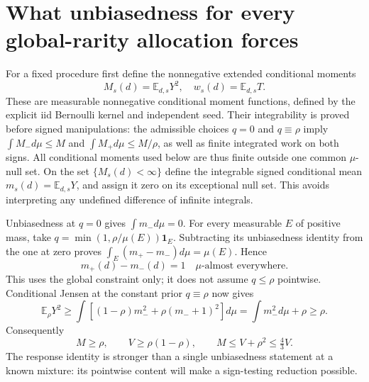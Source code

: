 \documentclass[11pt]{article}
\newcommand{\E}{\mathbb E}
\newcommand{\ind}{\mathbf1}
\begin{document}
\section{What unbiasedness for every global-rarity allocation forces}
For a fixed procedure first define the nonnegative extended conditional moments
\[
 M_s(d)=\E_{d,s}Y^2,
 \quad w_s(d)=\E_{d,s}T.
\]
These are measurable nonnegative conditional moment functions, defined by the
explicit iid Bernoulli kernel and independent seed. Their integrability is
proved before signed manipulations: the admissible choices $q=0$ and
$q\equiv\rho$ imply $\int M_-d\mu\le M$ and
$\int M_+d\mu\le M/\rho$, as well as finite integrated work on both signs.
All conditional moments used below are thus finite outside one common
$\mu$-null set. On the set $\{M_s(d)<\infty\}$ define the integrable signed
conditional mean $m_s(d)=\E_{d,s}Y$, and assign it zero on its exceptional null
set. This avoids interpreting any undefined difference of infinite integrals.

Unbiasedness at $q=0$ gives $\int m_-d\mu=0$.
For every measurable $E$ of positive mass, take
$q=\min(1,\rho/\mu(E))\ind_E$. Subtracting its unbiasedness identity from
the one at zero proves $\int_E(m_+-m_-)d\mu=\mu(E)$.
Hence
\[
 m_+(d)-m_-(d)=1\quad\mu\text{-almost everywhere}.         \tag{5}
\]
This uses the global constraint only; it does not assume $q\le\rho$ pointwise.
Conditional Jensen at the constant prior $q\equiv\rho$ now gives
\[
 \E_\rho Y^2\ge\int[(1-\rho)m_-^2+\rho(m_-+1)^2]d\mu
               =\int m_-^2d\mu+\rho\ge\rho.
\]
Consequently
\[
 M\ge\rho,\qquad V\ge\rho(1-\rho),\qquad
 M\le V+\rho^2\le\tfrac43V.                             \tag{6}
\]
The response identity is stronger than a single unbiasedness statement at a
known mixture: its pointwise content will make a sign-testing reduction possible.
\end{document}
